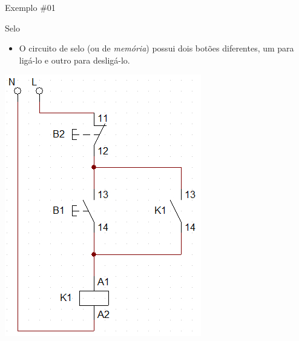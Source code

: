 \begin{frame}{Exemplo \#01}
\begin{block}{Selo}
\begin{itemize}
    \item O circuito de selo (ou de \textit{memória}) possui dois botões diferentes, um para ligá-lo e outro para desligá-lo.
\end{itemize}
\end{block}

\centerline{\includegraphics[height=0.7\textheight]{Figuras/Ch07/fig3.jpg}}
\end{frame}


